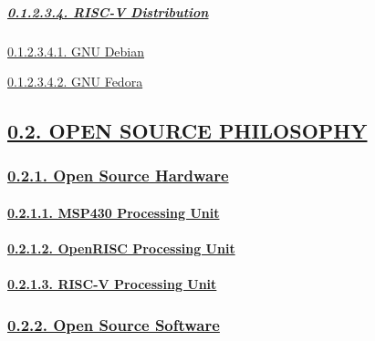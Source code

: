 \documentclass[
]{article}
\begin{document}
\hypertarget{risc-v-distribution}{%
\subparagraph{\texorpdfstring{\protect\hyperlink{risc-v-distribution-1}{0.1.2.3.4.
RISC-V
Distribution}}{0.1.2.3.4. RISC-V Distribution}}\label{risc-v-distribution}}

\protect\hyperlink{gnu-debian-5}{0.1.2.3.4.1. GNU Debian}

\protect\hyperlink{gnu-fedora-5}{0.1.2.3.4.2. GNU Fedora}

\hypertarget{open-source-philosophy}{%
\subsection{\texorpdfstring{\protect\hyperlink{open-source-philosophy-1}{0.2.
OPEN SOURCE
PHILOSOPHY}}{0.2. OPEN SOURCE PHILOSOPHY}}\label{open-source-philosophy}}

\hypertarget{open-source-hardware}{%
\subsubsection{\texorpdfstring{\protect\hyperlink{open-source-hardware-1}{0.2.1.
Open Source
Hardware}}{0.2.1. Open Source Hardware}}\label{open-source-hardware}}

\hypertarget{msp430-processing-unit}{%
\paragraph{\texorpdfstring{\protect\hyperlink{msp430-processing-unit-1}{0.2.1.1.
MSP430 Processing
Unit}}{0.2.1.1. MSP430 Processing Unit}}\label{msp430-processing-unit}}

\hypertarget{openrisc-processing-unit}{%
\paragraph{\texorpdfstring{\protect\hyperlink{openrisc-processing-unit-1}{0.2.1.2.
OpenRISC Processing
Unit}}{0.2.1.2. OpenRISC Processing Unit}}\label{openrisc-processing-unit}}

\hypertarget{risc-v-processing-unit}{%
\paragraph{\texorpdfstring{\protect\hyperlink{risc-v-processing-unit-1}{0.2.1.3.
RISC-V Processing
Unit}}{0.2.1.3. RISC-V Processing Unit}}\label{risc-v-processing-unit}}

\hypertarget{open-source-software}{%
\subsubsection{\texorpdfstring{\protect\hyperlink{open-source-software-1}{0.2.2.
Open Source
Software}}{0.2.2. Open Source Software}}\label{open-source-software}}
\end{document}
